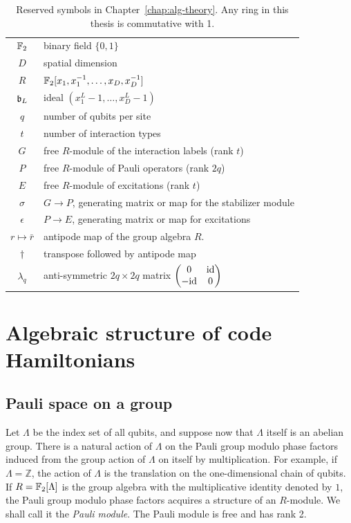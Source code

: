\begin{table}[t]
\centering
\begin{tabular}{c|l}
\hline
$\mathbb{F}_2$ & binary field $\{0,1\}$\\
$D$ & spatial dimension \\
$R$ & $\mathbb{F}_2[x_1, x_1^{-1}, \ldots, x_D, x_D^{-1}]$ \\
$\mathfrak{b}_L$ & ideal $(x_1^L-1,\ldots,x_D^L -1)$\\
$q$ & number of qubits per site \\
$t$ & number of interaction types \\
$G$ & free $R$-module of the interaction labels (rank $t$) \\
$P$ & free $R$-module of Pauli operators (rank $2q$)\\
$E$ & free $R$-module of excitations (rank $t$)\\
$\sigma$ & $G \to P$, generating matrix or map for the stabilizer module \\
$\epsilon$ & $P \to E$, generating matrix or map for excitations \\
$r \mapsto \bar r$ & antipode map of the group algebra $R$.\\
$\dagger$ & transpose followed by antipode map \\
$\lambda_q$ & anti-symmetric $2q \times 2q$ matrix $\begin{pmatrix} 0 & \mathrm{id} \\ -\mathrm{id} & 0 \end{pmatrix}$ \\
\hline
\end{tabular}
\caption{Reserved symbols in Chapter~\ref{chap:alg-theory}. Any ring in this thesis is commutative with 1.}
\end{table}

\section{Algebraic structure of code Hamiltonians}

\subsection{Pauli space on a group}
\label{sec:Pauli-space-on-group}

Let $\Lambda$ be the index set of all qubits,
and suppose now that $\Lambda$ itself is an abelian group.
There is a natural action of $\Lambda$ on the Pauli group modulo phase factors
induced from the group action of $\Lambda$ on itself by multiplication.
For example, if $\Lambda = \mathbb{Z}$,
the action of $\Lambda$ is the translation on the one-dimensional chain of qubits.
If $R=\mathbb{F}_2[\Lambda]$ is the group algebra with the multiplicative identity denoted by $1$,
the Pauli group modulo phase factors acquires a structure of an $R$-module.
We shall call it the {\em Pauli module}.
The Pauli module is free and has rank 2.

